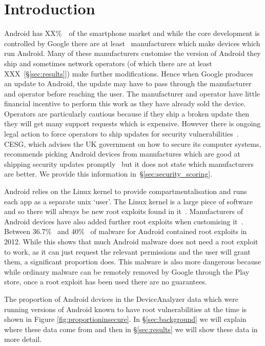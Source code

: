 \documentclass[conference,a4paper,twoside]{IEEEtran}
\newcommand{\percMarketShare}{XX\%~\cite{TODO}}
\newcommand{\daNumNetworkOperators}{XXX~[\S\ref{sec:results}]}
\begin{document}
\section{Introduction}
Android has \percMarketShare\ of the smartphone market and while the core development is controlled by Google there are at least \daNumManufacturers\ manufacturers which make devices which run Android.
Many of these manufacturers customise the version of Android they ship and sometimes network operators (of which there are at least \daNumNetworkOperators) make further modifications.
Hence when Google produces an update to Android, the update may have to pass through the manufacturer and operator before reaching the user.
The manufacturer and operator have little financial incentive to perform this work as they have already sold the device.
Operators are particularly cautious because if they ship a broken update then they will get many support requests which is expensive.
However there is ongoing legal action to force operators to ship updates for security vulnerabilities~\cite{Soghoian2013}.
CESG, which advises the UK government on how to secure its computer systems, recommends picking Android devices from manufactures which are good at shipping security updates promptly~\cite{CESG2013} but it does not state which manufacturers are better.
We provide this information in~\S\ref{sec:security_scoring}.

Android relies on the Linux kernel to provide compartmentalisation and runs each app as a separate unix `user'.
The Linux kernel is a large piece of software and so there will always be new root exploits found in it~\cite{TODO}.
Manufacturers of Android devices have also added further root exploits when customising it~\cite{Grace2012}.
Between 36.7\%~\cite{Zhou2012b} and 40\%~\cite{Zhou2012a} of malware for Android contained root exploits in 2012.
While this shows that much Android malware does not need a root exploit to work, as it can just request the relevant permissions and the user will grant them, a significant proportion does.
This malware is also more dangerous because while ordinary malware can be remotely removed by Google through the Play store, once a root exploit has been used there are no guarantees.

The proportion of Android devices in the DeviceAnalyzer data which were running versions of Android known to have root vulnerabilities at the time is shown in Figure \ref{fig:proportioninsecure}.
In \S\ref{sec:background} we will explain where these data come from and then in \S\ref{sec:results} we will show these data in more detail.
\end{document}
